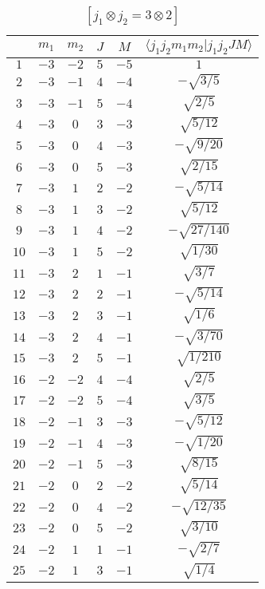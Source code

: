 \begin{table}
\tiny
\caption{$[j_1 \otimes j_2 = 3 \otimes 2]$}
\begin{center}
\begin{tabular}{|c|c|c|c|c|c|}
\hline 
   & $m_1$ & $m_2$ & $J$ & $M$ & $\langle j_1 j_2 m_1 m_2 | j_1 j_2 J M \rangle$ \\ 
\hline 
$1$ & $-3$ & $-2$ & $5$ & $-5$ & $1$ \\ 
$2$ & $-3$ & $-1$ & $4$ & $-4$ & $-\sqrt{3/5}$ \\ 
$3$ & $-3$ & $-1$ & $5$ & $-4$ & $\sqrt{2/5}$ \\ 
$4$ & $-3$ & $0$ & $3$ & $-3$ & $\sqrt{5/12}$ \\ 
$5$ & $-3$ & $0$ & $4$ & $-3$ & $-\sqrt{9/20}$ \\ 
$6$ & $-3$ & $0$ & $5$ & $-3$ & $\sqrt{2/15}$ \\ 
$7$ & $-3$ & $1$ & $2$ & $-2$ & $-\sqrt{5/14}$ \\ 
$8$ & $-3$ & $1$ & $3$ & $-2$ & $\sqrt{5/12}$ \\ 
$9$ & $-3$ & $1$ & $4$ & $-2$ & $-\sqrt{27/140}$ \\ 
$10$ & $-3$ & $1$ & $5$ & $-2$ & $\sqrt{1/30}$ \\ 
$11$ & $-3$ & $2$ & $1$ & $-1$ & $\sqrt{3/7}$ \\ 
$12$ & $-3$ & $2$ & $2$ & $-1$ & $-\sqrt{5/14}$ \\ 
$13$ & $-3$ & $2$ & $3$ & $-1$ & $\sqrt{1/6}$ \\ 
$14$ & $-3$ & $2$ & $4$ & $-1$ & $-\sqrt{3/70}$ \\ 
$15$ & $-3$ & $2$ & $5$ & $-1$ & $\sqrt{1/210}$ \\ 
$16$ & $-2$ & $-2$ & $4$ & $-4$ & $\sqrt{2/5}$ \\ 
$17$ & $-2$ & $-2$ & $5$ & $-4$ & $\sqrt{3/5}$ \\ 
$18$ & $-2$ & $-1$ & $3$ & $-3$ & $-\sqrt{5/12}$ \\ 
$19$ & $-2$ & $-1$ & $4$ & $-3$ & $-\sqrt{1/20}$ \\ 
$20$ & $-2$ & $-1$ & $5$ & $-3$ & $\sqrt{8/15}$ \\ 
$21$ & $-2$ & $0$ & $2$ & $-2$ & $\sqrt{5/14}$ \\ 
$22$ & $-2$ & $0$ & $4$ & $-2$ & $-\sqrt{12/35}$ \\ 
$23$ & $-2$ & $0$ & $5$ & $-2$ & $\sqrt{3/10}$ \\ 
$24$ & $-2$ & $1$ & $1$ & $-1$ & $-\sqrt{2/7}$ \\ 
$25$ & $-2$ & $1$ & $3$ & $-1$ & $\sqrt{1/4}$ \\ 

\end{tabular}
\end{center}
\end{table}
